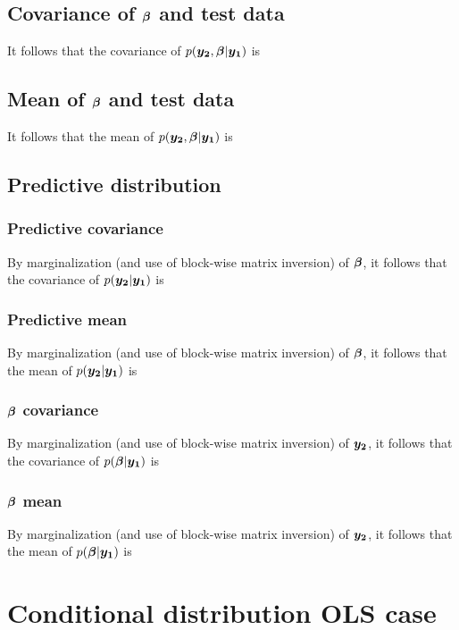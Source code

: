 \documentclass[twoside]{article}
\begin{document}
\subsection{Covariance of $\bm{\beta}$ and test data}
It follows that the covariance of $p(\bm{y_2},\bm{\beta}|\bm{y_1})$ is


\subsection{Mean of $\bm{\beta}$ and test data}

It follows that the mean of $p(\bm{y_2},\bm{\beta}|\bm{y_1})$ is

\subsection{Predictive distribution}
\subsubsection{Predictive covariance}
By marginalization (and use of block-wise matrix inversion) of $\bm{\beta}$, it follows that the covariance of $p(\bm{y_2}|\bm{y_1})$ is


\subsubsection{Predictive mean}

By marginalization (and use of block-wise matrix inversion) of $\bm{\beta}$, it follows that the mean of $p(\bm{y_2}|\bm{y_1})$ is

\subsubsection{ $\bm{\beta}$ covariance}
By marginalization (and use of block-wise matrix inversion) of $\bm{y_2}$, it follows that the covariance of $p(\bm{\beta}|\bm{y_1})$ is


\subsubsection{$\bm{\beta}$ mean}
By marginalization (and use of block-wise matrix inversion) of $\bm{y_2}$, it follows that the mean of $p(\bm{\beta}|\bm{y_1})$ is


\section{Conditional distribution OLS case}
\end{document}
